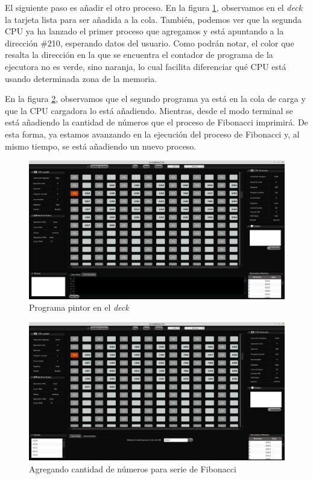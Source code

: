 \documentclass[letterpaper,12pt,oneside]{book}
\begin{document}
			
		\newpage
			El siguiente paso es añadir el otro proceso. En la figura \ref{fig:vm_add_pintor_deck}, observamos en el \textit{deck} la
			tarjeta lista para ser añadida a la cola. También, podemos ver que la segunda CPU ya ha lanzado el primer proceso que agregamos
			y está apuntando a la dirección \#210, esperando datos del usuario. Como podrán notar, el color que resalta la dirección en la
			que se encuentra el contador de programa de la ejecutora no es verde, sino naranja, lo cual facilita diferenciar 
			qué CPU está usando determinada zona de la memoria.
		 	
			
		\newpage
			En la figura \ref{fig:vm_fibonacci_putting_numer_of_digits}, observamos que el segundo programa ya está en la cola de carga
			y que la CPU cargadora lo está añadiendo. Mientras, desde el modo terminal 
			se está añadiendo la cantidad de números que
			el proceso de Fibonacci imprimirá. De esta forma, ya estamos avanzando en la ejecución del proceso de Fibonacci
			y, al mismo tiempo, se está añadiendo un nuevo proceso.
			
			\begin{figure}[H]		
				\centering
				\includegraphics[scale=0.32]{media/Paralela/vm_add_pintor_deck.png}
				\caption{Programa pintor en el \textit{deck}} 
				\label{fig:vm_add_pintor_deck}
			\end{figure}
			
			\begin{figure}[h]		
				\centering
				\includegraphics[scale=0.32]{media/Paralela/vm_fibonacci_putting_numer_of_digits.png}
				\caption{Agregando cantidad de números para serie de Fibonacci}
				\label{fig:vm_fibonacci_putting_numer_of_digits}
			\end{figure}
			
\end{document}
